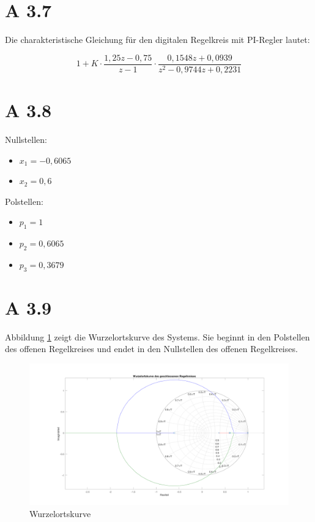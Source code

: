 \newpage

\section*{A 3.7}

Die charakteristische Gleichung für den digitalen Regelkreis mit PI-Regler lautet:

\begin{equation*}
	1 + K\cdot \frac{1,25z - 0,75}{z - 1}\cdot \frac{0,1548z + 0,0939}{z^2 - 0,9744z + 0,2231}
\end{equation*}


\section*{A 3.8}

Nullstellen:
\begin{itemize}
	\item $x_1 = -0,6065$
	\item $x_2 = 0,6$
\end{itemize}
Polstellen:
\begin{itemize}
	\item $p_1 = 1$
	\item $p_2 = 0,6065$
	\item $p_3 = 0,3679$
\end{itemize}
\newpage


\section*{A 3.9}

Abbildung \ref{wok} zeigt die Wurzelortskurve des Systems. Sie beginnt in den Polstellen des offenen Regelkreises und endet in den Nullstellen des offenen
Regelkreises.

\begin{figure}[h]
	\centering
	\includegraphics[width=1\linewidth]{images/wok.png}
	\caption{Wurzelortskurve}
	\label{wok}
\end{figure}


